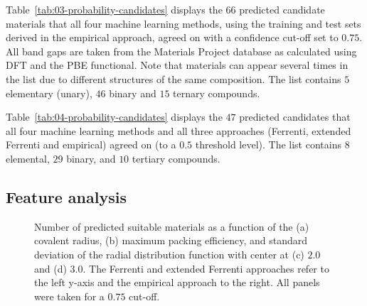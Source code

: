 \documentclass[superscriptaddress,unsortedaddress,
 amsmath,amssymb,
 aps,
]{revtex4-2}
\begin{document}
Table~\ref{tab:03-probability-candidates} displays the $66$ predicted candidate materials that all four machine learning methods, using the training and test sets derived in the empirical approach, agreed on with a confidence cut-off set to $0.75$. All band gaps are taken from the Materials Project database as calculated using DFT and the PBE functional. Note that materials can appear several times in the list due  to  different  structures of the same composition. The  list  contains $5$ elementary (unary), $46$ binary and  $15$ ternary compounds. 

\newpage 



Table~\ref{tab:04-probability-candidates} displays the $47$ predicted candidates that all four machine learning methods and all three approaches (Ferrenti, extended Ferrenti and empirical) agreed on (to a $0.5$ threshold level).    
The list contains $8$ elemental, $29$ binary, and $10$ tertiary compounds.



\subsection*{Feature analysis}

\begin{figure}[ht!]
\begin{subfigure}[t]{1\textwidth}
    
\end{subfigure}
\begin{subfigure}[b]{0.45\textwidth}
    \scalebox{0.85}{}
    \subcaption{}
\end{subfigure}
\begin{subfigure}[b]{0.45\textwidth}
    \scalebox{0.85}{}
    \subcaption{}
\end{subfigure}%

\begin{subfigure}[b]{0.45\textwidth}
    \scalebox{0.85}{}
    \subcaption{}
\end{subfigure}
\begin{subfigure}[b]{0.45\textwidth}
    \scalebox{0.85}{}
    \subcaption{}
\end{subfigure}%
\caption{Number of predicted suitable materials as a function of the (a) covalent radius, (b) maximum packing efficiency, and standard deviation of the radial distribution function with center at (c) $2.0$ and (d) $3.0$. 
The Ferrenti and extended Ferrenti approaches refer to the left y-axis and the empirical approach to the right. All panels were taken for a $0.75$ cut-off. }
\label{fig:histograms_supp1}
\end{figure}
\end{document}
